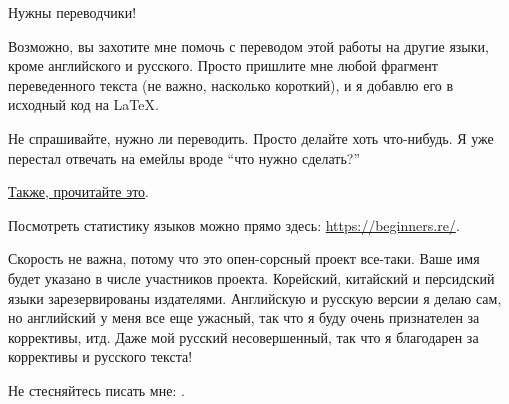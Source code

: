 \vspace*{\fill}

\Huge Нужны переводчики!
\normalsize

\bigskip
\bigskip
\bigskip

Возможно, вы захотите мне помочь с переводом этой работы на другие языки, кроме английского и русского.
Просто пришлите мне любой фрагмент переведенного текста (не важно, насколько короткий), и я добавлю его в исходный код на LaTeX.

Не спрашивайте, нужно ли переводить. Просто делайте хоть что-нибудь. Я уже перестал отвечать на емейлы вроде ``что нужно сделать?''

\href{\RepoURL/Translation.md}{Также, прочитайте это}.

Посмотреть статистику языков можно прямо здесь: \url{https://beginners.re/}.

Скорость не важна, потому что это опен-сорсный проект все-таки.
Ваше имя будет указано в числе участников проекта.
Корейский, китайский и персидский языки зарезервированы издателями.
Английскую и русскую версии я делаю сам, но английский у меня все еще ужасный, так что я буду очень признателен за коррективы, итд.
Даже мой русский несовершенный, так что я благодарен за коррективы и русского текста!

Не стесняйтесь писать мне: \GTT{\EMAILS}.

\vspace*{\fill}
\vfill
